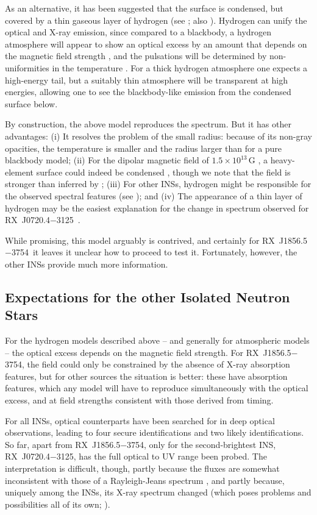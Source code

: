 \documentclass[iop]{emulateapj}
\newcommand{\rxjw}{RX~J1856.5$-$3754}
\newcommand{\rxjk}{RX~J0720.4$-$3125}
\begin{document}
As an alternative, it has been suggested that the surface is
condensed, but covered by a thin gaseous layer of hydrogen (see
\citealt{hkc+07}; also \citealt*{mzh03,ztd04}).  Hydrogen can unify the
optical and X-ray emission, since compared to a blackbody, a hydrogen
atmosphere will appear to show an optical excess by an amount that
depends on the magnetic field strength \citep*{hpc08}, and the
pulsations will be determined by non-uniformities in the temperature
\citep{ho07}.  For a thick hydrogen atmosphere one expects a
high-energy tail, but a suitably thin atmosphere will be transparent
at high energies, allowing one to see the blackbody-like emission from
the condensed surface below.

By construction, the above model reproduces the spectrum.  But it has
other advantages: (i) It resolves the problem of the small radius:
because of its non-gray opacities, the temperature is smaller and the
radius larger than for a pure blackbody model; (ii) For the dipolar
magnetic field of $1.5\times10^{13}\,$G \citep{vkk08}, a heavy-element
surface could indeed be condensed \citep{ml07b}, though we note that
the field is stronger than inferred by \cite{hkc+07}; (iii) For other
INSs, hydrogen might be responsible for the observed spectral features
(see \citealt{haberl07,vkk07}); and (iv) The appearance of a thin
layer of hydrogen may be the easiest explanation for the change in
spectrum observed for \rxjk\ \citep{vkkpm07}.

While promising, this model arguably is contrived, and certainly for
\rxjw\ it leaves it unclear how to proceed to test it.  Fortunately,
however, the other INSs provide much more information.

\subsection{Expectations for the other Isolated Neutron Stars}

For the hydrogen models described above -- and generally for
atmospheric models -- the optical excess depends on the magnetic field
strength.  For \rxjw, the field could only be constrained by the
absence of X-ray absorption features, but for other sources the
situation is better: these have absorption features, which any model
will have to reproduce simultaneously with the optical excess, and at
field strengths consistent with those derived from timing.





For all INSs, optical counterparts have been searched for in deep
optical observations, leading to four secure identifications and two
likely identifications.  So far, apart from \rxjw, only for the
second-brightest INS, \rxjk, has the full optical to UV range been
probed.  The interpretation is difficult, though, partly because the
fluxes are somewhat inconsistent with those of a Rayleigh-Jeans spectrum
\citep{kvkm+03,mzh03}, and partly because, uniquely among the INSs, its
X-ray spectrum changed (which poses problems and possibilities all of
its own; \citealt{dvvmv04,htdv+06,vkkpm07,hhv+09}).
\end{document}

